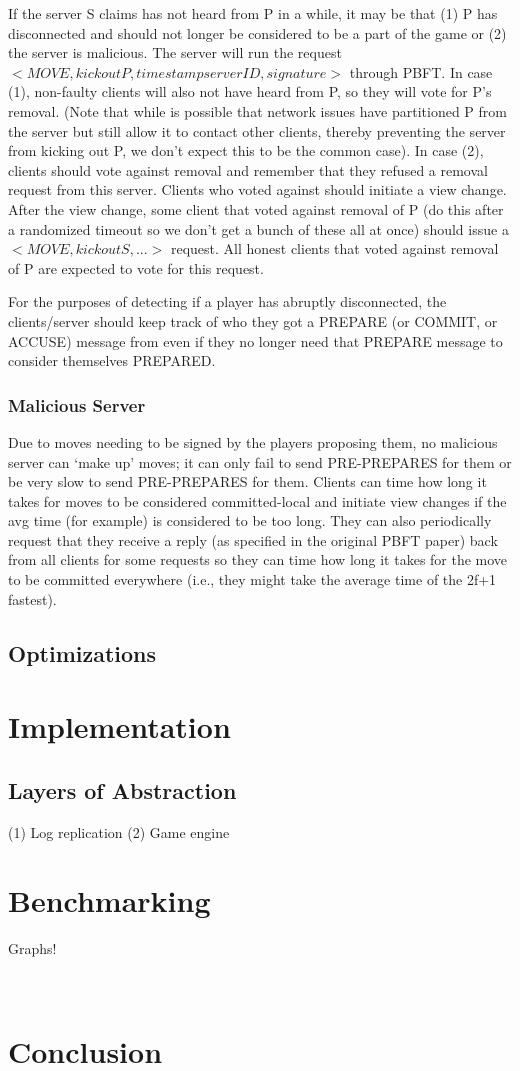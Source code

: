 \documentclass[12pt]{article}
\begin{document}
If the server S claims has not heard from P in a while, it may be that (1) P has disconnected and should not longer be considered to be a part of the game or (2) the server is malicious. The server will run the request $<MOVE, kick out P, timestamp serverID, signature>$ through PBFT. In case (1), non-faulty clients will also not have heard from P, so they will vote for P’s removal. (Note that while is possible that network issues have partitioned P from the server but still allow it to contact other clients, thereby preventing the server from kicking out P, we don’t expect this to be the common case). In case (2), clients should vote against removal and remember that they refused a removal request from this server. Clients who voted against should initiate a view change. After the view change, some client that voted against removal of P (do this after a randomized timeout so we don’t get a bunch of these all at once) should issue a $<MOVE, kick out S, ...>$ request. All honest clients that voted against removal of P are expected to vote for this request.

For the purposes of detecting if a player has abruptly disconnected, the clients/server should keep track of who they got a PREPARE (or COMMIT, or ACCUSE) message from even if they no longer need that PREPARE message to consider themselves PREPARED. 

\subsubsection{Malicious Server}

Due to moves needing to be signed by the players proposing them, no malicious server can ‘make up’ moves; it can only fail to send PRE-PREPARES for them or be very slow to send PRE-PREPARES for them. Clients can time how long it takes for moves to be considered committed-local and initiate view changes if the avg time (for example) is considered to be too long. They can also periodically request that they receive a reply (as specified in the original PBFT paper) back from all clients for some requests so they can time how long it takes for the move to be committed everywhere (i.e., they might take the average time of the 2f+1 fastest).  

\subsection{Optimizations}

\section{Implementation}

\subsection{Layers of Abstraction}

(1) Log replication
(2) Game engine

\section{Benchmarking}

Graphs!

~\cite{Nobody06}

\section{Conclusion}

{}

\end{document}
